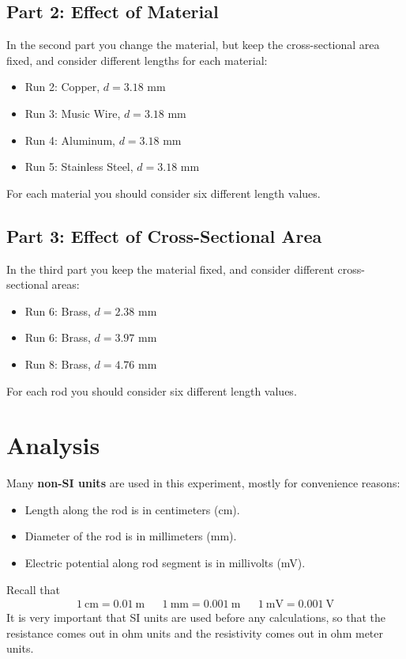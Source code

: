 \subsection{Part 2: Effect of Material}
%
In the second part you change the material, but keep the cross-sectional area fixed, and consider different lengths for each material:
\begin{itemize}
	\item Run 2: Copper, $d = 3.18$ mm
	\item Run 3: Music Wire, $d = 3.18$ mm
	\item Run 4: Aluminum, $d = 3.18$ mm
	\item Run 5: Stainless Steel, $d = 3.18$ mm
\end{itemize}
For each material you should consider six different length values.
%
\subsection{Part 3: Effect of Cross-Sectional Area}
%
In the third part you keep the material fixed, and consider different cross-sectional areas:
\begin{itemize}
	\item Run 6: Brass, $d = 2.38$ mm
	\item Run 6: Brass, $d = 3.97$ mm
	\item Run 8: Brass, $d = 4.76$ mm
\end{itemize}
For each rod you should consider six different length values.
%
\section{Analysis}
%
Many \textbf{non-SI units} are used in this experiment, mostly for convenience reasons:
\begin{itemize}
	\item Length along the rod is in centimeters (cm).
	\item Diameter of the rod is in millimeters (mm).
	\item Electric potential along rod segment is in millivolts (mV).
\end{itemize}
Recall that
\begin{align}
	1 \ \text{cm} = 0.01 \ \text{m} && 1 \ \text{mm} = 0.001 \ \text{m} && 1 \ \text{mV} = 0.001 \ \text{V}
\end{align}
It is very important that SI units are used before any calculations, so that the resistance comes out in ohm units and the resistivity comes out in ohm{ }\textperiodcentered{ }meter units.
%
